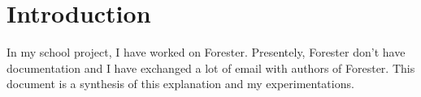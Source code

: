 \section {Introduction}

In my school project, I have worked on Forester. Presentely, Forester don't have documentation and I have exchanged a lot of email with authors of Forester. This document is a synthesis of this explanation and my experimentations.